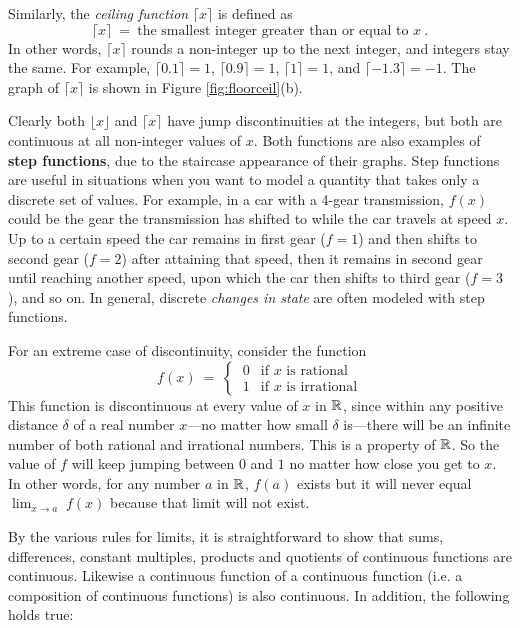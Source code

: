 \begin{exmp}
\noindent Similarly, the \emph{ceiling function}
$\lceil x \rceil$ is defined as
\[
\lceil x \rceil ~=~ \text{the smallest integer greater than or equal to $x$} ~.
\]
In other words, $\lceil x \rceil$ rounds a non-integer up to the next integer,
and integers stay the same. For example,
$\lceil 0.1 \rceil = 1$, $\lceil 0.9 \rceil = 1$,
$\lceil 1 \rceil = 1$, and $\lceil -1.3 \rceil = -1$. The graph of
$\lceil x \rceil$ is shown in Figure \ref{fig:floorceil}(b).

Clearly both $\lfloor x \rfloor$ and $\lceil x \rceil$ have jump discontinuities
at the integers, but both are continuous at all non-integer values of $x$. Both
functions are also examples of
\textbf{step functions},
due to the staircase appearance of their graphs. Step functions are useful in
situations when you want to model a quantity that takes only a discrete set of
values. For example, in a car with a 4-gear transmission, $f(x)$ could be the
gear the transmission has shifted to while the car travels at speed $x$. Up to a
certain speed the car remains in first gear ($f = 1$) and then shifts to second
gear ($f = 2$) after attaining that speed, then it remains in second gear until
reaching another speed, upon which the car then shifts to third gear ($f = 3$),
and so on. In general, discrete \emph{changes in state} are often modeled with
step functions.
\end{exmp}
\begin{exmp}\label{exmp:discontall}
\noindent For an extreme case of discontinuity, consider the function
\[
f(x) ~=~ \begin{cases}
           ~0  & \text{if $x$ is rational}\\
           ~1  & \text{if $x$ is irrational}
         \end{cases}
\]
This function is discontinuous at every value of $x$ in $\mathbb{R}$, since within
any positive distance $\delta$ of a real number $x$---no matter how small
$\delta$ is---there will be an infinite number of both rational and irrational
numbers. This is a property of $\mathbb{R}$. So the value of $f$ will keep jumping
between $0$ and $1$ no matter how close you get to $x$. In other words, for any
number $a$ in $\mathbb{R}$, $f(a)$ exists but it will never equal
$\lim_{x \to a}\;f(x)$ because that limit will not exist.
\end{exmp}
\divider
\vspace{3mm}

By the various rules for limits, it is straightforward to show that sums,
differences, constant multiples, products and quotients of continuous functions
are continuous. Likewise a continuous function of a continuous function (i.e. a
composition of continuous functions) is also continuous. In addition,
the following holds true:

